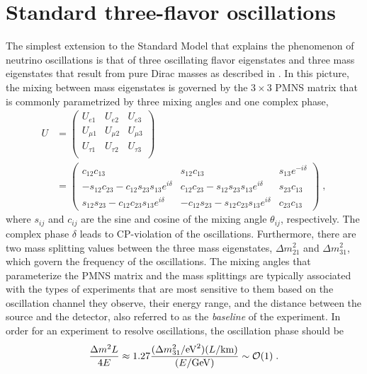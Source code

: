 \section{Standard three-flavor oscillations}
The simplest extension to the Standard Model that explains the phenomenon of neutrino oscillations is that of three oscillating flavor eigenstates and three mass eigenstates that result from pure Dirac masses as described in .
In this picture, the mixing between mass eigenstates is governed by the $3\times3$ PMNS matrix that is commonly parametrized by three mixing angles and one complex phase,
\begin{equation}
\begin{aligned}
    U &=
    \begin{pmatrix}
    U_{e1}    & U_{e2}    & U_{e3}    \\
    U_{\mu1}  & U_{\mu2}  & U_{\mu3}  \\
    U_{\tau1} & U_{\tau2} & U_{\tau3} \\
    \end{pmatrix} \\
    &=
    \begin{pmatrix}
        c_{12} c_{13} & s_{12} c_{13} & s_{13}e^{-i\delta}       \\
        -s_{12}c_{23} - c_{12}s_{23}s_{13}e^{i\delta} & c_{12}c_{23}-s_{12}s_{23}s_{13}e^{i\delta} & s_{23}c_{13} \\
        s_{12}s_{23}-c_{12}c_{23}s_{13}e^{i\delta} & -c_{12}s_{23}-s_{12}c_{23}s_{13}e^{i\delta} & c_{23}c_{13}
    \end{pmatrix}\;,
\end{aligned}\label{eq:pmns-parametrization}
\end{equation}
where $s_{ij}$ and $c_{ij}$ are the sine and cosine of the mixing angle $\theta_{ij}$, respectively.
The complex phase $\delta$ leads to CP-violation of the oscillations.
Furthermore, there are two mass splitting values between the three mass eigenstates, $\Delta m^2_{21}$ and $\Delta m^2_{31}$, which govern the frequency of the oscillations.
The mixing angles that parameterize the PMNS matrix and the mass splittings are typically associated with the types of experiments that are most sensitive to them based on the oscillation channel they observe, their energy range, and the distance between the source and the detector, also referred to as the \emph{baseline} of the experiment.
In order for an experiment to resolve oscillations, the oscillation phase should be
\begin{equation}
    \frac{\Delta m^2 L}{4E} \approx 1.27\frac{(\Delta m^2_{31}/\si{eV^2})(L/\si{\kilo\meter})}{(E/\si{\giga\electronvolt})} \sim \order{1}\;.
\end{equation}
